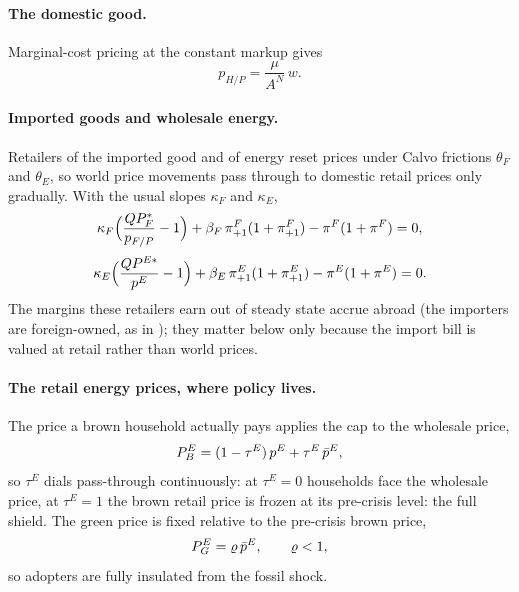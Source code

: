 \paragraph{The domestic good.}
Marginal-cost pricing at the constant markup gives
%
\begin{equation}
p_{H/P}=\frac{\mu}{A^N}\,w.
\label{eq:pH}
\end{equation}

\paragraph{Imported goods and wholesale energy.}
Retailers of the imported good and of energy reset prices under Calvo frictions
$\theta_F$ and $\theta_E$, so world price movements pass through to domestic
retail prices only gradually. With the usual slopes $\kappa_F$ and $\kappa_E$,
%
\begin{equation}
\kappa_F\Bigl(\frac{Q P^{*}_F}{p_{F/P}}-1\Bigr)
+ \beta_F\,\pi^F_{+1}(1+\pi^F_{+1}) - \pi^F(1+\pi^F)=0,
\label{eq:pF}
\end{equation}
\begin{equation}
\kappa_E\Bigl(\frac{Q P^{E*}}{p^{E}}-1\Bigr)
+ \beta_E\,\pi^E_{+1}(1+\pi^E_{+1}) - \pi^E(1+\pi^E)=0.
\label{eq:pE-nkpc}
\end{equation}
%
The margins these retailers earn out of steady state accrue abroad (the importers
are foreign-owned, as in \citealp{ARS2024}); they matter below only because the
import bill is valued at retail rather than world prices.

\paragraph{The retail energy prices, where policy lives.}
The price a brown household actually pays applies the cap to the wholesale price,
%
\begin{equation}
P^{E}_{B}=(1-\tau^E)\,p^{E}+\tau^E\,\bar p^E,
\label{eq:cap}
\end{equation}
%
so $\tau^E$ dials pass-through continuously: at $\tau^E=0$ households face the
wholesale price, at $\tau^E=1$ the brown retail price is frozen at its pre-crisis
level: the full shield. The green price is fixed relative to the pre-crisis brown
price,
%
\begin{equation}
P^{E}_{G}=\varrho\,\bar p^E,
\qquad \varrho<1,
\label{eq:pEG2}
\end{equation}
%
so adopters are fully insulated from the fossil shock.

